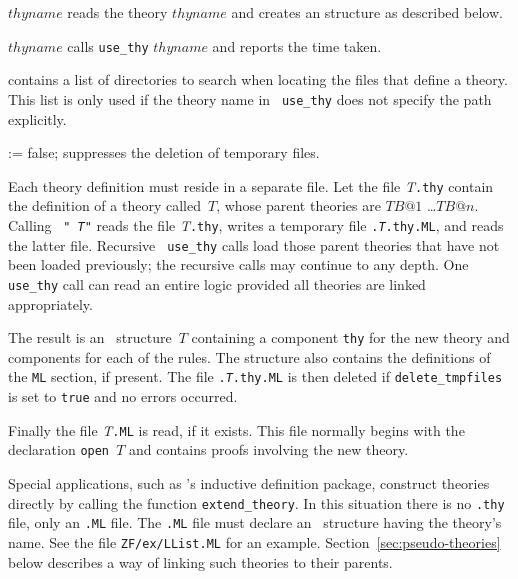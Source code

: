 \begin{ttdescription}
\item[\ttindexbold{use_thy} $thyname$] 
  reads the theory $thyname$ and creates an \ML{} structure as described below.

\item[\ttindexbold{time_use_thy} $thyname$] 
  calls {\tt use_thy} $thyname$ and reports the time taken.

\item[\ttindexbold{loadpath}] 
  contains a list of directories to search when locating the files that
  define a theory.  This list is only used if the theory name in {\tt
    use_thy} does not specify the path explicitly.

\item[\ttindexbold{delete_tmpfiles} := false;] 
suppresses the deletion of temporary files.
\end{ttdescription}
%
Each theory definition must reside in a separate file.  Let the file {\it
  T}{\tt.thy} contain the definition of a theory called~$T$, whose parent
theories are $TB@1$ \dots $TB@n$.  Calling ~{\tt"{\it
  T\/}"} reads the file {\it T}{\tt.thy}, writes a temporary \ML{}
file {\tt.{\it T}.thy.ML}, and reads the latter file.  Recursive {\tt
  use_thy} calls load those parent theories that have not been loaded
previously; the recursive calls may continue to any depth.  One {\tt use_thy}
call can read an entire logic provided all theories are linked appropriately.

The result is an \ML\ structure~$T$ containing a component {\tt thy} for
the new theory and components for each of the rules.  The structure also
contains the definitions of the {\tt ML} section, if present.  The file
{\tt.{\it T}.thy.ML} is then deleted if {\tt delete_tmpfiles} is set
to {\tt true} and no errors occurred.

Finally the file {\it T}{\tt.ML} is read, if it exists.  This file normally
begins with the declaration {\tt open~$T$} and contains proofs involving
the new theory.

Special applications, such as \ZF's inductive definition package, construct
theories directly by calling the \ML{} function {\tt extend_theory}.  In
this situation there is no {\tt.thy} file, only an {\tt.ML} file.  The
{\tt.ML} file must declare an \ML\ structure having the theory's name.  See
the file {\tt ZF/ex/LList.ML} for an example.
Section~\ref{sec:pseudo-theories} below describes a way of linking such
theories to their parents.

